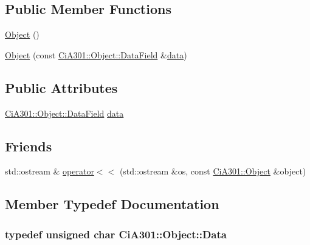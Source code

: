 \subsection*{Public Member Functions}
\begin{DoxyCompactItemize}
\item 
\hyperlink{struct_ci_a301_1_1_object_ab365a7598e622b5b507787697683d093}{Object} ()
\item 
\hyperlink{struct_ci_a301_1_1_object_aca61b59c9441700459832e7943e0eeb6}{Object} (const \hyperlink{struct_ci_a301_1_1_object_a2344da0462f8dd535bbf311be83d435a}{Ci\+A301\+::\+Object\+::\+Data\+Field} \&\hyperlink{struct_ci_a301_1_1_object_a73870d74c7ffaaf07515bf4a5d5330ea}{data})
\end{DoxyCompactItemize}
\subsection*{Public Attributes}
\begin{DoxyCompactItemize}
\item 
\hyperlink{struct_ci_a301_1_1_object_a2344da0462f8dd535bbf311be83d435a}{Ci\+A301\+::\+Object\+::\+Data\+Field} \hyperlink{struct_ci_a301_1_1_object_a73870d74c7ffaaf07515bf4a5d5330ea}{data}
\end{DoxyCompactItemize}
\subsection*{Friends}
\begin{DoxyCompactItemize}
\item 
std\+::ostream \& \hyperlink{struct_ci_a301_1_1_object_a0f593415e55eb9ec790ba65258158a19}{operator$<$$<$} (std\+::ostream \&os, const \hyperlink{struct_ci_a301_1_1_object}{Ci\+A301\+::\+Object} \&object)
\end{DoxyCompactItemize}


\subsection{Member Typedef Documentation}
\hypertarget{struct_ci_a301_1_1_object_a9fd091097bb03da4a28a403485c3a10f}{}
\subsubsection[{Data}]{\setlength{\rightskip}{0pt plus 5cm}typedef unsigned char {\bf Ci\+A301\+::\+Object\+::\+Data}}\label{struct_ci_a301_1_1_object_a9fd091097bb03da4a28a403485c3a10f}
\hypertarget{struct_ci_a301_1_1_object_a2344da0462f8dd535bbf311be83d435a}{}

